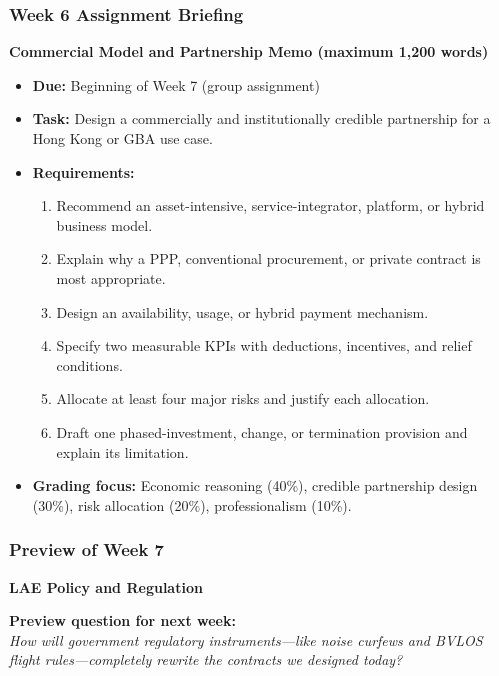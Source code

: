 \documentclass{beamer}
\begin{document}
\begin{frame}[t]
\frametitle{Week 6 Assignment Briefing}
\textbf{Commercial Model and Partnership Memo (maximum 1,200 words)}
\begin{itemize}
\item \textbf{Due:} Beginning of Week 7 (group assignment)
\item \textbf{Task:} Design a commercially and institutionally credible partnership for a Hong Kong or GBA use case.
\item \textbf{Requirements:}
\begin{enumerate}
\item Recommend an asset-intensive, service-integrator, platform, or hybrid business model.
\item Explain why a PPP, conventional procurement, or private contract is most appropriate.
\item Design an availability, usage, or hybrid payment mechanism.
\item Specify two measurable KPIs with deductions, incentives, and relief conditions.
\item Allocate at least four major risks and justify each allocation.
\item Draft one phased-investment, change, or termination provision and explain its limitation.
\end{enumerate}
\item \textbf{Grading focus:} Economic reasoning (40\%), credible partnership design (30\%), risk allocation (20\%), professionalism (10\%).
\end{itemize}
\end{frame}

\begin{frame}[t]
  \frametitle{Preview of Week 7}
  
  \begin{center}
      \Large \textbf{LAE Policy and Regulation}
  \end{center}
  
  \vspace{1cm}
  \textbf{Preview question for next week:} \\
  \textit{How will government regulatory instruments—like noise curfews and BVLOS flight rules—completely rewrite the contracts we designed today?}
\end{frame}
\end{document}
